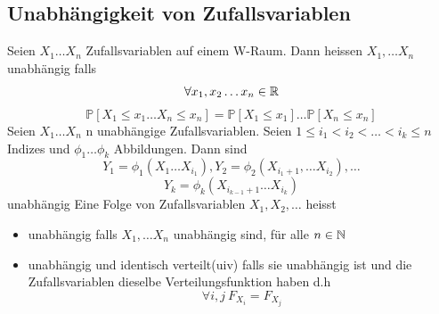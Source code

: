 \subsection{Unabhängigkeit von Zufallsvariablen}
\Def[2.5] \newline
Seien \( X_1 \dots X_n \) Zufallsvariablen auf einem W-Raum. Dann heissen \(X_1, \dots X_n \) unabhängig falls \[ \forall x_1, x_2 \dots x_n \in \mathbb{R} \] \[\mathbb{P}[X_1 \leq x_1 \dots X_n \leq x_n ] = \mathbb{P}[X_1 \leq x_1] \dots \mathbb{P}[X_n \leq x_n]\]
 \newline
Seien \(X_1 \dots X_n\) n unabhängige Zufallsvariablen. Seien \( 1 \leq i_1 < i_2 < \dots < i_k \leq n \) Indizes und \(\phi_1 \dots \phi_k\) Abbildungen. Dann sind  \[ Y_1 = \phi_1(X_1 \dots X_{i_1}), Y_2 = \phi_2(X_{i_{1}+1}, \dots X_{i_2}), \dots \] \[Y_k = \phi_k(X_{i_{k-1}+1} \dots X_{i_k})\] unabhängig \newline
\newline \newline
\Def[2.8] \newline
Eine Folge von Zufallsvariablen \(X_1, X_2, \dots \) heisst
\begin{itemize}
    \item unabhängig falls \(X_1, \dots X_n \) unabhängig sind, für alle \(n \in  \mathbb{N}\)
    \item unabhängig und identisch verteilt(uiv) falls sie unabhängig ist und die Zufallsvariablen dieselbe Verteilungsfunktion haben d.h \[ \forall i, j \ F_{X_i} = F_{X_j}\]
\end{itemize}
